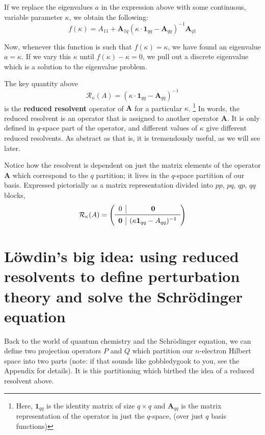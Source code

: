 \documentclass{article}
\begin{document}
If we replace the eigenvalues $a$ in the expression above with some continuous, variable parameter $\kappa$, we obtain the following: 
\[f(\kappa) =  A_{11} + \mathbf{A}_{1q}( \kappa \cdot \mathbf{1}_{qq} - \mathbf{A}_{qq})^{-1} \mathbf{A}_{q1} \]

Now, whenever this function is such that $f(\kappa) = \kappa $, we have found an eigenvalue $a = \kappa$.
If we vary this $\kappa$ until $f(\kappa) - \kappa = 0$, we pull out a discrete eigenvalue which is a solution to the eigenvalue problem. 

The key quantity above 
\[\mathcal{R}_{\kappa}(A) = ( \kappa \cdot \mathbf{1}_{qq} - \mathbf{A}_{qq})^{-1}\]
is the \textbf{reduced resolvent} operator of $\mathbf{A}$ for a particular $\kappa$.
\footnote{Here, $\mathbf{1}_{qq}$ is the identity matrix of size $q \times q$ and $\mathbf{A}_{qq}$ is 
 the matrix representation of the operator in just the $q$-space, (over just $q$ basis functions)}
In words, the reduced resolvent is an operator that is assigned to another operator $\mathbf{A}$.
It is only defined in $q$-space part of the operator, and different values of $\kappa$ give different reduced resolvents.
As abstract as that is, it is tremendously useful, as we will see later.

Notice how the resolvent is dependent on just the matrix elements of the operator $\mathbf{A}$
which correspond to the $q$ partition; it lives in the $q$-space partition of our basis.
Expressed pictorially as a matrix representation divided into $pp$, $pq$, $qp$, $qq$ blocks,
\[\mathcal{R}_{\kappa}(A) =
\left( \begin{array}{c|c}
   0 & \mathbf{0} \\
   \midrule
   \mathbf{0} & (\kappa \mathbf{1}_{qq} - A_{qq})^{-1} \\
\end{array}\right)
  \]

\section{L{\"o}wdin's big idea: using reduced resolvents to define perturbation theory and solve the Schr{\"o}dinger equation}
Back to the world of quantum chemistry and the Schr{\"o}dinger equation, 
we can define two projection operators $P$ and $Q$ which partition our $n$-electron Hilbert space into two parts (note: if that sounds like gobbledygook to you, see the Appendix for details).
It is this partitioning which birthed the idea of a reduced resolvent above.
\end{document}
